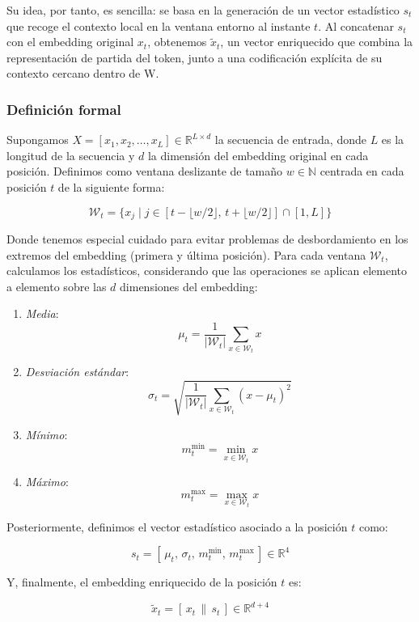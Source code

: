 Su idea, por tanto, es sencilla: se basa en la generación de un vector estadístico $s_t$ que recoge el contexto local en la ventana entorno al instante $t$. Al concatenar $s_t$ con el embedding original $x_t$, obtenemos $\tilde{x}_t$, un vector enriquecido que combina la representación de partida del token, junto a una codificación explícita de su contexto cercano dentro de W.

\subsubsection{Definición formal}

Supongamos $X = [x_1, x_2, \dots, x_L] \in \mathbb{R}^{L \times d}$ la secuencia de entrada, donde $L$ es la longitud de la secuencia y $d$ la dimensión del embedding original en cada posición. Definimos como ventana deslizante de tamaño $w \in \mathbb{N}$ centrada en cada posición $t$ de la siguiente forma:

\[
\mathcal{W}_t = \{ x_j \mid j \in [t - \lfloor w/2 \rfloor,\, t + \lfloor w/2 \rfloor] \cap [1, L] \}
\]

Donde tenemos especial cuidado para evitar problemas de desbordamiento en los extremos del embedding (primera y última posición). Para cada ventana $\mathcal{W}_t$, calculamos los estadísticos, considerando que las operaciones se aplican elemento a elemento sobre las $d$ dimensiones del embedding:

\begin{enumerate}
	\item \textit{Media}:
	\[
	\mu_t = \frac{1}{|\mathcal{W}_t|} \sum_{x \in \mathcal{W}_t} x
	\]
	\item \textit{Desviación estándar}:
	\[
	\sigma_t = \sqrt{ \frac{1}{|\mathcal{W}_t|} \sum_{x \in \mathcal{W}_t} (x - \mu_t)^2 }
	\]
	\item \textit{Mínimo}:
	\[
	m^{\min}_t = \min_{x \in \mathcal{W}_t} x
	\]
	\item \textit{Máximo}:
	\[
	m^{\max}_t = \max_{x \in \mathcal{W}_t} x
	\]
\end{enumerate}

Posteriormente, definimos el vector estadístico asociado a la posición $t$ como:

\[
s_t = [\,\mu_t,\, \sigma_t,\, m^{\min}_t,\, m^{\max}_t\,] \in \mathbb{R}^{4}
\]

Y, finalmente, el embedding enriquecido de la posición $t$ es:

\[
\tilde{x}_t = [\,x_t \, \| \, s_t\,] \in \mathbb{R}^{d+4}
\]

